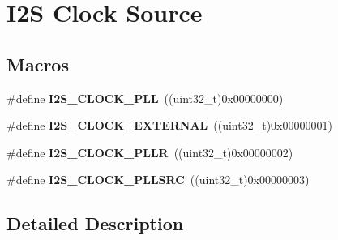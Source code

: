\hypertarget{group___i2_s___clock___source}{}\section{I2S Clock Source}
\label{group___i2_s___clock___source}
\subsection*{Macros}
\begin{DoxyCompactItemize}
\item 
\#define {\bfseries I2\+S\+\_\+\+C\+L\+O\+C\+K\+\_\+\+P\+LL}~((uint32\+\_\+t)0x00000000)\hypertarget{group___i2_s___clock___source_ga5ea0e2b2803b77f9eff8701bec18f72c}{}\label{group___i2_s___clock___source_ga5ea0e2b2803b77f9eff8701bec18f72c}

\item 
\#define {\bfseries I2\+S\+\_\+\+C\+L\+O\+C\+K\+\_\+\+E\+X\+T\+E\+R\+N\+AL}~((uint32\+\_\+t)0x00000001)\hypertarget{group___i2_s___clock___source_ga5aeda901ff98c213b8faf4dabb15af12}{}\label{group___i2_s___clock___source_ga5aeda901ff98c213b8faf4dabb15af12}

\item 
\#define {\bfseries I2\+S\+\_\+\+C\+L\+O\+C\+K\+\_\+\+P\+L\+LR}~((uint32\+\_\+t)0x00000002)\hypertarget{group___i2_s___clock___source_gaa600737d5aec81b95bc160980b67b6c4}{}\label{group___i2_s___clock___source_gaa600737d5aec81b95bc160980b67b6c4}

\item 
\#define {\bfseries I2\+S\+\_\+\+C\+L\+O\+C\+K\+\_\+\+P\+L\+L\+S\+RC}~((uint32\+\_\+t)0x00000003)\hypertarget{group___i2_s___clock___source_ga5554f6cbcc5299ac54466d18eb5a9809}{}\label{group___i2_s___clock___source_ga5554f6cbcc5299ac54466d18eb5a9809}

\end{DoxyCompactItemize}


\subsection{Detailed Description}
